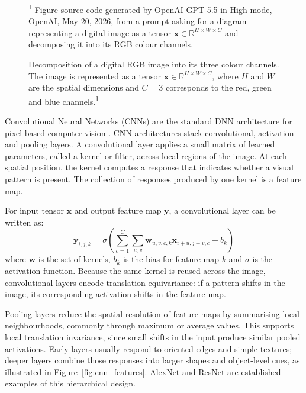 \begin{figure}[H]
    \caption[Decomposition of a digital RGB image into its three colour channels.]{Decomposition of a digital RGB image into its three colour channels. The image is represented as a tensor $\mathbf{x} \in \mathbb{R}^{H \times W \times C}$, where $H$ and $W$ are the spatial dimensions and $C = 3$ corresponds to the red, green and blue channels.\textsuperscript{1}}
    \label{fig:rgb_tensor_decomposition}
    \vspace{0.3em}
    \begin{minipage}{0.92\textwidth}
        \footnotesize\textsuperscript{1} Figure source code generated by OpenAI GPT-5.5 in High mode, OpenAI, May 20, 2026, from a prompt asking for a diagram representing a digital image as a tensor $\mathbf{x} \in \mathbb{R}^{H \times W \times C}$ and decomposing it into its RGB colour channels.
    \end{minipage}
\end{figure}

Convolutional Neural Networks (CNNs) are the standard DNN architecture for pixel-based computer
vision \cite{lecun2015deeplearning}. CNN architectures stack convolutional, activation and pooling
layers. A convolutional layer applies a small matrix of learned parameters, called a kernel or
filter, across local regions of the image. At each spatial position, the kernel computes a response
that indicates whether a visual pattern is present. The collection of responses produced by one
kernel is a feature map.

For input tensor $\mathbf{x}$ and output feature map $\mathbf{y}$, a convolutional layer can be
written as:
\begin{equation}
    \mathbf{y}_{i,j,k} =
    \sigma\left(
    \sum_{c=1}^{C} \sum_{u,v} \mathbf{w}_{u,v,c,k}\mathbf{x}_{i+u,j+v,c} + b_k
    \right)
\end{equation}
where $\mathbf{w}$ is the set of kernels, $b_k$ is the bias for feature map $k$ and $\sigma$ is the
activation function. Because the same kernel is reused across the image, convolutional layers encode
translation equivariance: if a pattern shifts in the image, its corresponding activation shifts in
the feature map.

Pooling layers reduce the spatial resolution of feature maps by summarising local neighbourhoods,
commonly through maximum or average values. This supports local translation invariance, since small
shifts in the input produce similar pooled activations. Early layers usually respond to oriented
edges and simple textures; deeper layers combine those responses into larger shapes and
object-level cues, as illustrated in Figure~\ref{fig:cnn_features}. AlexNet
\cite{krizhevsky2012imagenet} and ResNet \cite{he2016resnet} are established examples of this
hierarchical design.

